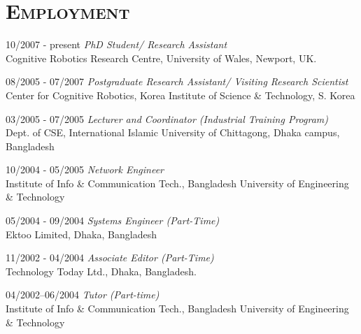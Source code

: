 \documentclass[notopicbreak,contbibnum,plain]{simplecv}
\begin{document}
\section{\textsc{Employment}}
\begin{topic}
	\item[10/2007 - present] \textit{PhD Student/ Research Assistant}\\
    Cognitive Robotics Research Centre,
    University of Wales, Newport, UK.
\vspace*{-0.1cm}    
    \item[08/2005 - 07/2007] \textit{Postgraduate Research Assistant/ Visiting Research Scientist\\}
    Center for Cognitive Robotics,
    Korea Institute of Science \& Technology, S. Korea
\vspace*{-0.1cm}
\item[03/2005 - 07/2005] \textit{Lecturer and Coordinator (Industrial Training Program)}\\
	Dept. of CSE, International Islamic University of Chittagong, Dhaka campus, Bangladesh
\vspace*{-0.1cm}    
    \item[10/2004 - 05/2005] \textit{Network Engineer}\\
	Institute of Info \& Communication Tech.,
	Bangladesh University of Engineering \& Technology
\vspace*{-0.1cm}
	\item[05/2004 - 09/2004]\textit{ Systems Engineer (Part-Time)}\\
	Ektoo Limited, Dhaka, Bangladesh
\vspace*{-0.1cm}
	\item[11/2002 - 04/2004] \textit{Associate Editor (Part-Time)}\\
	Technology Today Ltd., Dhaka, Bangladesh.
\vspace*{-0.1cm}
	\item[04/2002--06/2004] \textit{Tutor (Part-time)}\\
	 Institute of Info \& Communication Tech.,
	Bangladesh University of Engineering \& Technology        
\end{topic}
\vspace*{-0.1cm}
\end{document}
